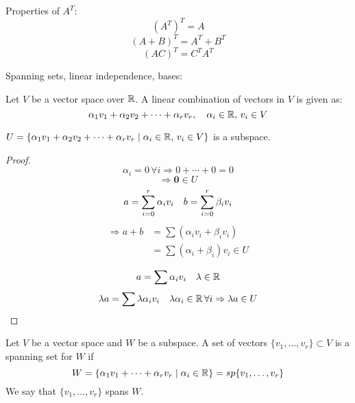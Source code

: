 \documentclass[a4paper,10pt]{article}
\begin{document}
Properties of $A^T$:
\[
	{(A^T)}^T = A
\]
\[
	{(A+B)}^T = A^T + B^T
\]
\[
	{(AC)}^T = C^T A^T
\]

Spanning sets, linear independence, bases:

\begin{defn}
	Let $V$ be a vector space over $\mathbb{R}$. A linear combination of vectors in $V$ is given as:
	\[
		\alpha_1 v_1 + \alpha_2 v_2 + \cdots + \alpha_r v_r, \quad
		\alpha_i \in \mathbb{R}, \, v_i \in V
	\]
\end{defn}

\begin{prop}
	$U = \{
		\alpha_1 v_1 + \alpha_2 v_2 + \cdots + \alpha_r v_r \mid
		\alpha_i \in \mathbb{R}, \, v_i \in V
	\}$ is a subspace.
\end{prop}

\begin{proof}
	\[
		\alpha_i = 0 \, \forall i \Rightarrow 0 + \cdots + 0 = 0
	\]
	\[
		\Rightarrow \bm{0} \in U
	\]
	\[
		a = \sum_{i=0}^r \alpha_i v_i \quad
		b = \sum_{i=0}^r \beta_i v_i \\
	\]
	\begin{align*}
		\Rightarrow a + b &= \sum (\alpha_i v_i + \beta_i v_i) \\
		&= \sum (\alpha_i + \beta_i) v_i \in U
	\end{align*}

	\[
		a = \sum \alpha_i v_i \quad \lambda \in \mathbb{R}
	\]
	\[
		\lambda a = \sum \lambda \alpha_i v_i \quad
		\lambda \alpha_i \in \mathbb{R} \, \forall i
		\Rightarrow \lambda a \in U
	\]
\end{proof}

\begin{defn}
	Let $V$ be a vector space and $W$ be a subspace. A set of vectors
	$\{v_1, \ldots, v_r\} \subset V$ is a spanning set for $W$ if
	\[
		W =
		\{\alpha_1 v_1 + \cdots + \alpha_r v_r \mid \alpha_i \in \mathbb{R}\}
		= sp\{v_1, \ldots, v_r\}
	\]
	We say that $\{v_1, \ldots, v_r\}$ spans $W$.
\end{defn}
\end{document}
